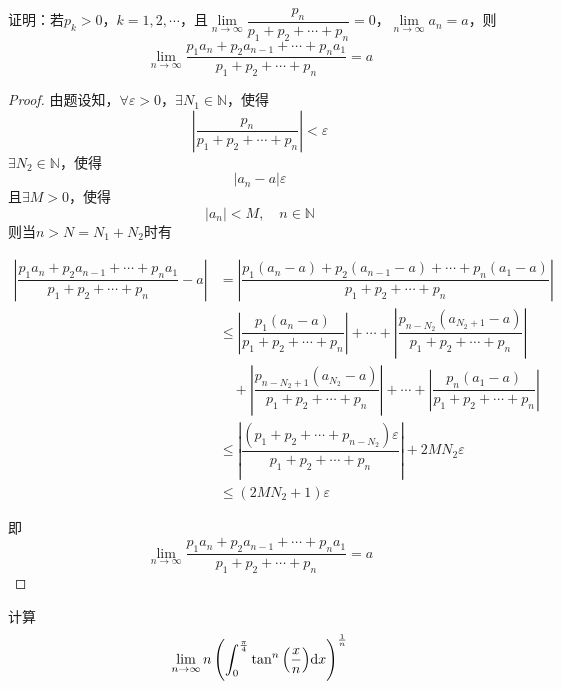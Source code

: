 \begin{proposition}
    
    证明：若$p_k > 0$，$k = 1, 2, \cdots$，且$\lim\limits_{n\to \infty}{\dfrac{p_n}{p_1 + p_2 + \cdots + p_n}} = 0$，$\lim\limits_{n \to \infty}{a_n} = a$，则
    $$\lim\limits_{n \to \infty}{\dfrac{p_1 a_n + p_2 a_{n - 1} + \cdots + p_n a_1}{p_1 + p_2 + \cdots + p_n}} = a$$

\end{proposition}

\begin{proof}

    由题设知，$\forall \varepsilon > 0$，$\exists N_1 \in \mathbb{N}$，使得
    $$\left| \dfrac{p_n}{p_1 + p_2 + \cdots + p_n} \right| < \varepsilon$$
    $\exists N_2 \in \mathbb{N}$，使得
    $$|a_n - a| \varepsilon$$
    且$\exists M > 0$，使得
    $$|a_n| < M, \quad n \in \mathbb{N}$$
    则当$n > N = N_1 + N_2$时有

    \begin{align*}
        \left| \dfrac{p_1 a_n + p_2 a_{n - 1} + \cdots + p_n a_1}{p_1 + p_2 + \cdots + p_n} - a \right| & = \left| \dfrac{p_1 (a_n - a) + p_2 (a_{n - 1} - a) + \cdots + p_n (a_1 - a)}{p_1 + p_2 + \cdots + p_n} \right| \\
        & \leq \left| \dfrac{p_1 (a_n - a)}{p_1 + p_2 + \cdots + p_n} \right| + \cdots + \left| \dfrac{p_{n - N_2} (a_{N_2 + 1} - a)}{p_1 + p_2 + \cdots + p_n} \right| \\
        & \quad + \left| \dfrac{p_{n - N_2 + 1} (a_{N_2} - a)}{p_1 + p_2 + \cdots + p_n} \right| + \cdots + \left| \dfrac{p_n (a_1 - a)}{p_1 + p_2 + \cdots + p_n} \right| \\
        & \leq \left| \dfrac{(p_1 + p_2 + \cdots + p_{n - N_2})\varepsilon}{p_1 + p_2 + \cdots + p_n} \right| + 2M N_2 \varepsilon \\
        & \leq (2M N_2 + 1) \varepsilon
    \end{align*}

    即
    $$\lim\limits_{n \to \infty}{\dfrac{p_1 a_n + p_2 a_{n - 1} + \cdots + p_n a_1}{p_1 + p_2 + \cdots + p_n}} = a$$
    
\end{proof}

\begin{proposition}

    计算
    $$\lim\limits_{n \to \infty}{n \left( \int_{0}^{\frac{\pi}{4}}{\tan^n{\left( \dfrac{x}{n} \right)}}\mathrm{d} x \right)^{\frac{1}{n}}}$$

\end{proposition}

